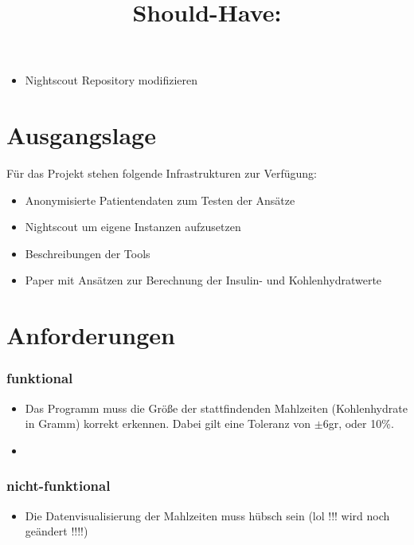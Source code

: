 \documentclass[accentcolor=tud0b,12pt,paper=a4]{tudreport}
\begin{document}
\title{\textbf{Should-Have:}}

\begin{itemize}	
	\item Nightscout Repository modifizieren 




	
\end{itemize}
	
	\chapter{Ausgangslage}

Für das Projekt stehen folgende Infrastrukturen zur Verfügung: 
\begin{itemize}
	\item Anonymisierte Patientendaten zum Testen der Ansätze
	\item Nightscout um eigene Instanzen aufzusetzen 
	\item Beschreibungen der Tools
	\item Paper mit Ansätzen zur Berechnung der Insulin- und Kohlenhydratwerte
\end{itemize}
		
	\chapter{Anforderungen}
	\subsection{funktional}
\begin{itemize}
	\item Das Programm muss die Größe der stattfindenden Mahlzeiten (Kohlenhydrate in Gramm) korrekt erkennen. Dabei gilt eine Toleranz von $\pm$6gr, oder 10\%.
	\item  
\end{itemize}
	
	\subsection{nicht-funktional}
\begin{itemize}
	\item Die Datenvisualisierung der Mahlzeiten muss hübsch sein  (lol !!! wird noch geändert !!!!)
\end{itemize}
	
\end{document}
